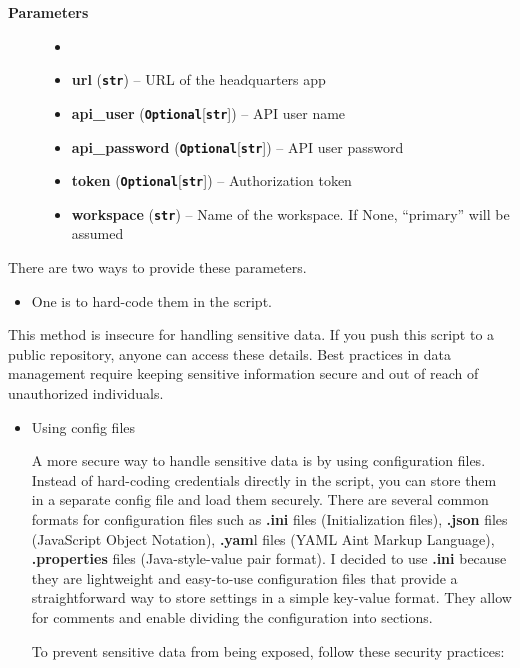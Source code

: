 \documentclass[
  letterpaper,
  DIV=11,
  numbers=noendperiod]{scrreprt}
\providecommand{\tightlist}{%
  \setlength{\itemsep}{0pt}\setlength{\parskip}{0pt}}\usepackage{longtable,booktabs,array}
\begin{document}
\begin{description}
\item[\textbf{Parameters}]
\begin{itemize}
\item[]
\item
  \textbf{url} (\textbf{\texttt{str}}) -- URL of the headquarters app
\item
  \textbf{api\_user}
  (\textbf{\texttt{Optional}}{[}\textbf{\texttt{str}}{]}) -- API user
  name
\item
  \textbf{api\_password}
  (\textbf{\texttt{Optional}}{[}\textbf{\texttt{str}}{]}) -- API user
  password
\item
  \textbf{token} (\textbf{\texttt{Optional}}{[}\textbf{\texttt{str}}{]})
  -- Authorization token
\item
  \textbf{workspace} (\textbf{\texttt{str}}) -- Name of the workspace.
  If None, ``primary'' will be assumed
\end{itemize}
\end{description}

There are two ways to provide these parameters.

\begin{itemize}
\tightlist
\item
  One is to hard-code them in the script.
\end{itemize}

This method is insecure for handling sensitive data. If you push this
script to a public repository, anyone can access these details. Best
practices in data management require keeping sensitive information
secure and out of reach of unauthorized individuals.

\begin{itemize}
\item
  Using config files

  A more secure way to handle sensitive data is by using configuration
  files. Instead of hard-coding credentials directly in the script, you
  can store them in a separate config file and load them securely. There
  are several common formats for configuration files such as
  \textbf{.ini} files (Initialization files), \textbf{.json} files
  (JavaScript Object Notation), \textbf{.yam}l files (YAML Aint Markup
  Language), \textbf{.properties} files (Java-style-value pair format).
  I decided to use \textbf{.ini} because they are lightweight and
  easy-to-use configuration files that provide a straightforward way to
  store settings in a simple key-value format. They allow for comments
  and enable dividing the configuration into sections.

  To prevent sensitive data from being exposed, follow these security
  practices:
\end{itemize}
\end{document}
